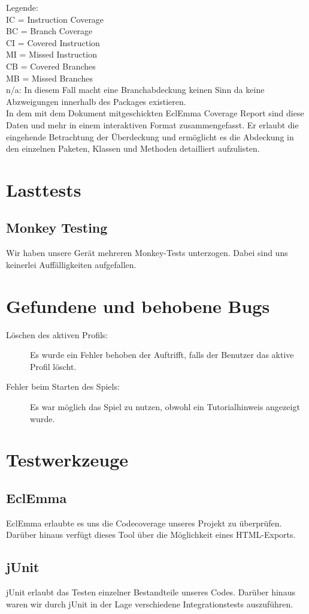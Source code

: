 \documentclass[parskip=full]{scrreprt}
\begin{document}
Legende: \\
	IC = Instruction Coverage \\
	BC = Branch Coverage \\
	CI = Covered Instruction \\
	MI = Missed Instruction \\
	CB = Covered Branches \\
	MB = Missed Branches \\
	n/a: In diesem Fall macht eine Branchabdeckung keinen Sinn da keine Abzweigungen innerhalb des Packages existieren. \\

In dem mit dem Dokument mitgeschickten EclEmma Coverage Report sind diese Daten und mehr in einem interaktiven Format zusammengefasst. 
Er erlaubt die eingehende Betrachtung der Überdeckung und ermöglicht es die Abdeckung in den einzelnen Paketen, Klassen und Methoden detailliert aufzulisten.

\chapter{Lasttests}

\section{Monkey Testing}

Wir haben unsere Gerät mehreren Monkey-Tests unterzogen. Dabei sind uns keinerlei Auffälligkeiten aufgefallen.

\chapter{Gefundene und behobene Bugs}

\begin{description}
	\item[Löschen des aktiven Profils:] Es wurde ein Fehler behoben der Auftrifft, falls der Benutzer das aktive Profil löscht.
	\item[Fehler beim Starten des Spiels: ] Es war möglich das Spiel zu nutzen, obwohl ein Tutorialhinweis angezeigt wurde.
\end{description}

\chapter{Testwerkzeuge}

\section{EclEmma}

EclEmma erlaubte es uns die Codecoverage unseres Projekt zu überprüfen. Darüber hinaus verfügt dieses Tool über die Möglichkeit eines HTML-Exports.

\section{jUnit}

jUnit erlaubt das Testen einzelner Bestandteile unseres Codes. Darüber hinaus waren wir durch jUnit in der Lage verschiedene Integrationstests auszuführen.
\end{document}
